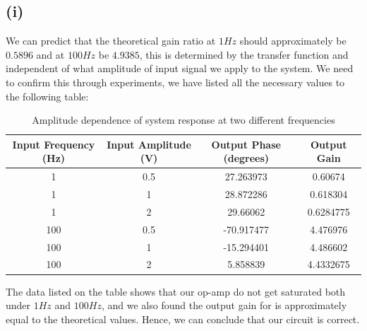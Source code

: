 \documentclass[letterpaper]{article}
\begin{document}
\subsection*{(i)}
We can predict that the theoretical gain ratio at $1 Hz$ should approximately be $0.5896$ and at $100 Hz$ be $4.9385$, this is determined by the transfer function and independent of what amplitude of input signal we apply to the system. We need to confirm this through experiments, we have listed all the necessary values to the following table:
\begin{table}[hbt]
\begin{center}
    \begin{tabular}{|c|c|c|c|}
        \hline
        Input Frequency (Hz) & Input Amplitude (V) & Output Phase (degrees) & Output Gain \\ \hline
        1                    & 0.5             & 27.263973                & 0.60674               \\ 
        1                    & 1               & 28.872286                & 0.618304               \\ 
        1                    & 2               & 29.66062                & 0.6284775               \\ 
        100                  & 0.5             & -70.917477               & 4.476976                \\ 
        100                  & 1               & -15.294401               & 4.486602                \\ 
        100                  & 2               & 5.858839               & 4.4332675               \\
        \hline
    \end{tabular}
\end{center}
\caption{Amplitude dependence of system response at two different frequencies}
\label{q1_it}
\end{table}
The data listed on the table shows that our op-amp do not get saturated both under $1 Hz$ and $100 Hz$, and we also found the output gain for is approximately equal to the theoretical values. Hence, we can conclude that our circuit is correct.
\end{document}
